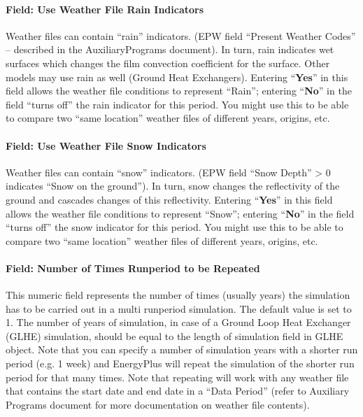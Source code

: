 \paragraph{Field: Use Weather File Rain Indicators}\label{field-use-weather-file-rain-indicators}

Weather files can contain ``rain'' indicators. (EPW field ``Present Weather Codes'' -- described in the AuxiliaryPrograms document). In turn, rain indicates wet surfaces which changes the film convection coefficient for the surface. Other models may use rain as well (Ground Heat Exchangers). Entering ``\textbf{Yes}'' in this field allows the weather file conditions to represent ``Rain''; entering ``\textbf{No}'' in the field ``turns off'' the rain indicator for this period. You might use this to be able to compare two ``same location'' weather files of different years, origins, etc.

\paragraph{Field: Use Weather File Snow Indicators}\label{field-use-weather-file-snow-indicators}

Weather files can contain ``snow'' indicators. (EPW field ``Snow Depth'' \textgreater{} 0 indicates ``Snow on the ground''). In turn, snow changes the reflectivity of the ground and cascades changes of this reflectivity. Entering ``\textbf{Yes}'' in this field allows the weather file conditions to represent ``Snow''; entering ``\textbf{No}'' in the field ``turns off'' the snow indicator for this period. You might use this to be able to compare two ``same location'' weather files of different years, origins, etc.

\paragraph{Field: Number of Times Runperiod to be Repeated}\label{field-number-of-times-runperiod-to-be-repeated}

This numeric field represents the number of times (usually years) the simulation has to be carried out in a multi runperiod simulation. The default value is set to 1. The number of years of simulation, in case of a Ground Loop Heat Exchanger (GLHE) simulation, should be equal to the length of simulation field in GLHE object. Note that you can specify a number of simulation years with a shorter run period (e.g. 1 week) and EnergyPlus will repeat the simulation of the shorter run period for that many times. Note that repeating will work with any weather file that contains the start date and end date in a ``Data Period'' (refer to Auxiliary Programs document for more documentation on weather file contents).

